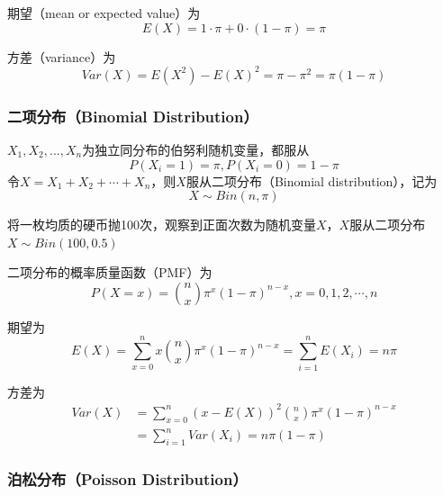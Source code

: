 期望（mean or expected value）为
\begin{equation}
    E(X) = 1 \cdot \pi + 0 \cdot (1-\pi) = \pi
\end{equation}

方差（variance）为
\begin{equation}
    Var(X) = E(X^2) - E(X)^2 = \pi - \pi^2 = \pi(1-\pi)
\end{equation}

\subsubsection{二项分布（Binomial Distribution）}

$X_1,X_2,...,X_n$为独立同分布的伯努利随机变量，都服从
\begin{equation}
    P(X_i = 1) = \pi, P(X_i = 0) = 1 - \pi
\end{equation}
令$X = X_1 + X_2 + \cdots + X_n$，则$X$服从二项分布（Binomial distribution），记为
\begin{equation}
    X \sim Bin(n, \pi)
\end{equation}

\begin{example}
    将一枚均质的硬币抛100次，观察到正面次数为随机变量$X$，$X$服从二项分布$X \sim Bin(100, 0.5)$
\end{example}

二项分布的概率质量函数（PMF）为
\begin{equation}
    P(X = x) = \binom{n}{x}\pi^x(1-\pi)^{n-x}, x = 0,1,2,\cdots,n
\end{equation}

期望为
\begin{equation}
    E(X) = \sum_{x=0}^n x \binom{n}{x}\pi^x(1-\pi)^{n-x} = \sum_{i=1}^n E(X_i) = n\pi
\end{equation}

方差为
\begin{equation}
    \begin{aligned}
        Var(X) & = \sum_{x=0}^n (x - E(X))^2 \binom{n}{x}\pi^x(1-\pi)^{n-x} \\
               & = \sum_{i=1}^n Var(X_i) = n\pi(1-\pi)
    \end{aligned}
\end{equation}

\subsubsection{泊松分布（Poisson Distribution）}

